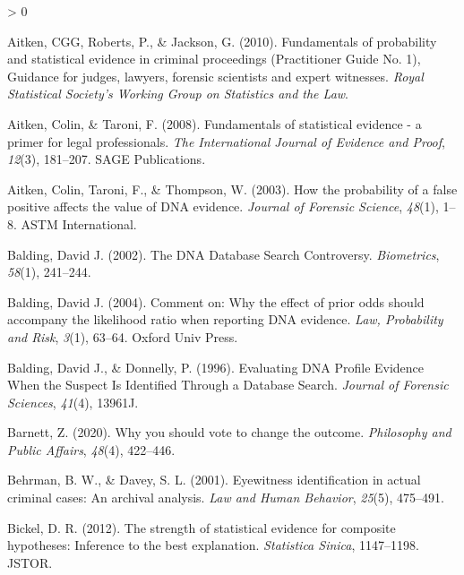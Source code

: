 \documentclass[
  10pt,
  dvipsnames,enabledeprecatedfontcommands]{scrartcl}
\newlength{\cslhangindent}
\newenvironment{CSLReferences}[2] %
 {%
  \setlength{\parindent}{0pt}
  \ifodd #1 \everypar{\setlength{\hangindent}{\cslhangindent}}\ignorespaces\fi
  \ifnum #2 > 0
  \setlength{\parskip}{#2\baselineskip}
  \fi
 }%
 {}
\begin{document}
\hypertarget{refs}{}
\begin{CSLReferences}{1}{0}
\leavevmode\hypertarget{ref-aitken2010fundamentals}{}%
Aitken, CGG, Roberts, P., \& Jackson, G. (2010). Fundamentals of
probability and statistical evidence in criminal proceedings
({P}ractitioner {G}uide {N}o. 1), {G}uidance for judges, lawyers,
forensic scientists and expert witnesses. \emph{Royal Statistical
Society's Working Group on Statistics and the Law}.

\leavevmode\hypertarget{ref-aitken2008fundamentals}{}%
Aitken, Colin, \& Taroni, F. (2008). Fundamentals of statistical
evidence - a primer for legal professionals. \emph{The International
Journal of Evidence and Proof}, \emph{12}(3), 181--207. SAGE
Publications.

\leavevmode\hypertarget{ref-aitken2003probability}{}%
Aitken, Colin, Taroni, F., \& Thompson, W. (2003). How the probability
of a false positive affects the value of DNA evidence. \emph{Journal of
Forensic Science}, \emph{48}(1), 1--8. ASTM International.

\leavevmode\hypertarget{ref-balding2002DNDatabaseSearch}{}%
Balding, David J. (2002). The {DNA Database Search Controversy}.
\emph{Biometrics}, \emph{58}(1), 241--244.

\leavevmode\hypertarget{ref-balding2004comment}{}%
Balding, David J. (2004). Comment on: Why the effect of prior odds
should accompany the likelihood ratio when reporting DNA evidence.
\emph{Law, Probability and Risk}, \emph{3}(1), 63--64. Oxford Univ
Press.

\leavevmode\hypertarget{ref-balding1996EvaluatingDNAProfilea}{}%
Balding, David J., \& Donnelly, P. (1996). Evaluating {DNA Profile
Evidence When} the {Suspect Is Identified Through} a {Database Search}.
\emph{Journal of Forensic Sciences}, \emph{41}(4), 13961J.

\leavevmode\hypertarget{ref-Barnett2020Why}{}%
Barnett, Z. (2020). Why you should vote to change the outcome.
\emph{Philosophy and Public Affairs}, \emph{48}(4), 422--446.

\leavevmode\hypertarget{ref-behrman2001EyewitnessIdentificationActual}{}%
Behrman, B. W., \& Davey, S. L. (2001). Eyewitness identification in
actual criminal cases: {An} archival analysis. \emph{Law and Human
Behavior}, \emph{25}(5), 475--491.

\leavevmode\hypertarget{ref-bickel2012strength}{}%
Bickel, D. R. (2012). The strength of statistical evidence for composite
hypotheses: Inference to the best explanation. \emph{Statistica Sinica},
1147--1198. JSTOR.


\end{CSLReferences}
\end{document}
